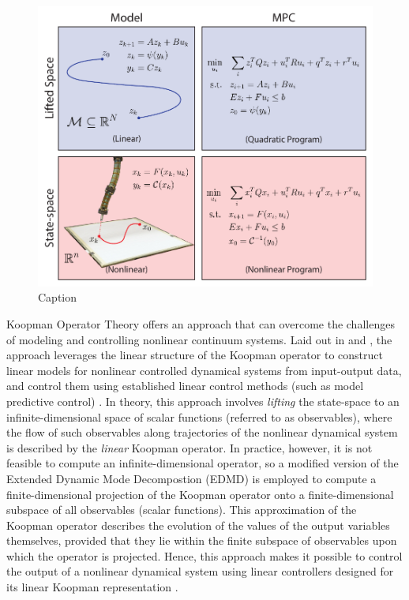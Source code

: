\begin{figure}
    \centering
    \includegraphics[width=\linewidth]{figures/overview_v7_ph.pdf}
    \caption{Caption}
    \label{fig:overview}
\end{figure}


Koopman Operator Theory offers an approach that can overcome the challenges of modeling and controlling nonlinear continuum systems.
Laid out in \citet{mauroy2016linear} and \citet{korda2018linear}, the approach leverages the linear structure of the Koopman operator to construct linear models for nonlinear controlled dynamical systems from input-output data, and control them using established linear control methods (such as model predictive control) .
In theory, this approach involves \emph{lifting} the state-space to an infinite-dimensional space of scalar functions (referred to as observables), where the flow of such observables along trajectories of the nonlinear dynamical system is described by the \emph{linear} Koopman operator.
In practice, however, it is not feasible to compute an infinite-dimensional operator, so a modified version of the Extended Dynamic Mode Decompostion (EDMD) is employed to compute a finite-dimensional projection of the Koopman operator onto a finite-dimensional subspace of all observables (scalar functions).
This approximation of the Koopman operator describes the evolution of the values of the output variables themselves, provided that they lie within the finite subspace of observables upon which the operator is projected.
Hence, this approach makes it possible to control the output of a nonlinear dynamical system using linear controllers designed for its linear Koopman representation .


